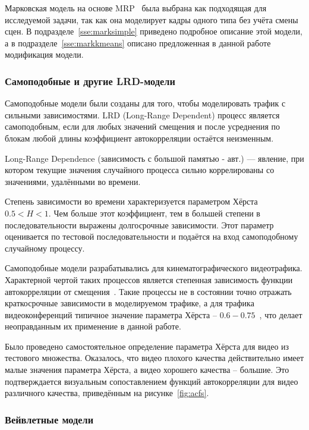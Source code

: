 Марковская модель на основе MRP~\cite{heymanATM} была
выбрана как подходящая для исследуемой задачи, так как
она моделирует кадры одного типа без учёта смены сцен.
В подразделе~\ref{sse:marksimple} приведено подробное
описание этой модели, а в подразделе~\ref{sse:markkmeans}
описано предложенная в данной работе модификация модели.

\subsubsection{Самоподобные и другие LRD-модели}
\hspace{3pt}

Самоподобные модели были созданы для того, чтобы
моделировать трафик с сильными зависимостями.
LRD (Long-Range Dependent) процесс является самоподобным,
если для любых значений смещения и после усреднения по
блокам любой длины коэффициент автокорреляции остаётся
неизменным.

Long-Range Dependence (зависимость с большой памятью - авт.) ---
явление, при котором текущие значения случайного процесса
сильно коррелированы со значениями, удалёнными во времени.

Степень зависимости во времени характеризуется параметром
Хёрста $0.5 < H < 1$. Чем больше этот коэффициент, тем в большей
степени в последовательности выражены долгосрочные зависимости.
Этот параметр оценивается по тестовой
последовательности и подаётся на вход самоподобному случайному процессу.

Самоподобные модели разрабатывались для кинематографического видеотрафика.
Характерной чертой таких процессов является степенная зависимость
функции автокорреляции от смещения~\cite{selfsimilar}. Такие процессы
не в состоянии точно отражать краткосрочные зависимости
в моделируемом трафике, а для трафика видеоконференций типичное
значение параметра Хёрста -- $0.6-0.75$~\cite{raey}, что делает
неоправданным их применение в данной работе.

Было проведено самостоятельное определение параметра Хёрста для
видео из тестового множества. Оказалось, что видео плохого качества
действительно имеет малые значения параметра Хёрста, а видео хорошего
качества -- большие. Это подтверждается визуальным сопоставлением функций
автокорреляции для видео различного качества, приведённым на рисунке~\ref{fig:acfs}.

\subsubsection{Вейвлетные модели}
\hspace{3pt}

